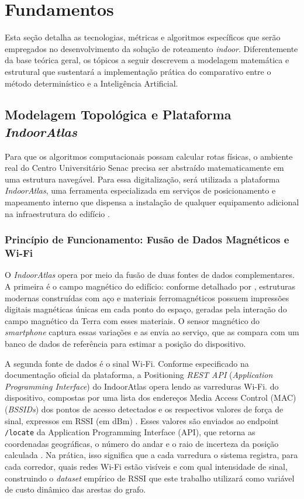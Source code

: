 \documentclass[
    12pt,                %
    openright,           %
    oneside,             %
    a4paper,             %
    english,             %
    brazil               %
]{abntex2}
\begin{document}
\section{Fundamentos}
\label{sec:fundamentos}

Esta seção detalha as tecnologias, métricas e algoritmos específicos que serão empregados no desenvolvimento da solução de roteamento \textit{indoor}. Diferentemente da base teórica geral, os tópicos a seguir descrevem a modelagem matemática e estrutural que sustentará a implementação prática do comparativo entre o método determinístico e a Inteligência Artificial.

\subsection{Modelagem Topológica e Plataforma \textit{IndoorAtlas}}

Para que os algoritmos computacionais possam calcular rotas físicas, o ambiente real do
Centro Universitário Senac precisa ser abstraído matematicamente em uma estrutura navegável.
Para essa digitalização, será utilizada a plataforma \textit{IndoorAtlas}, uma ferramenta
especializada em serviços de posicionamento e mapeamento interno que dispensa a instalação
de qualquer equipamento adicional na infraestrutura do edifício \cite{Stancel2021}.

\subsubsection*{Princípio de Funcionamento: Fusão de Dados Magnéticos e Wi-Fi}

O \textit{IndoorAtlas} opera por meio da fusão de duas fontes de dados complementares.
A primeira é o campo magnético do edifício: conforme detalhado por ,
estruturas modernas construídas com aço e materiais ferromagnéticos possuem impressões
digitais magnéticas únicas em cada ponto do espaço, geradas pela interação do campo
magnético da Terra com esses materiais. O sensor magnético do \textit{smartphone} captura
essas variações e as envia ao serviço, que as compara com um banco de dados de referência
para estimar a posição do dispositivo.

A segunda fonte de dados é o sinal Wi-Fi. Conforme especificado na documentação oficial
da plataforma, a Positioning \textit{REST API} (\textit{Application Programming Interface}) do 
IndoorAtlas opera lendo as varreduras Wi-Fi. do dispositivo, compostas por uma lista dos endereços Media Access Control (MAC)
(\textit{BSSIDs}) dos pontos de acesso detectados e os respectivos valores de força de
sinal, expressos em RSSI (em dBm) \cite{IndoorAtlas2025}. Esses valores são enviados ao
endpoint \texttt{/locate} da Application Programming Interface (API), que retorna as coordenadas geográficas, o número do andar
e o raio de incerteza da posição calculada \cite{IndoorAtlas2025}. Na prática, isso
significa que a cada varredura o sistema registra, para cada corredor, quais redes Wi-Fi
estão visíveis e com qual intensidade de sinal, construindo o \textit{dataset} empírico de
RSSI que este trabalho utilizará como variável de custo dinâmico das arestas do grafo.
\end{document}
